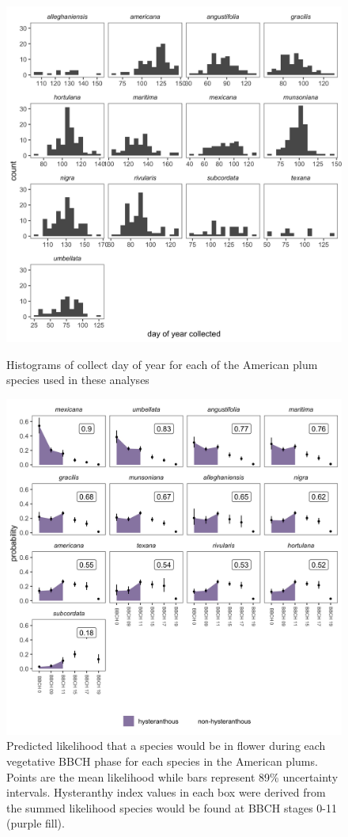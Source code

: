 \documentclass{article}[11pt]
\begin{document}
\begin{figure}[h!]
    \centering
 \includegraphics[width=.5\textwidth]{..//..//Plots/whatReviwerswant/seasonal_distrbn.jpeg}
    \label{fig:bias}
     \caption{Histograms of collect day of year for each of the American plum species used in these analyses}
\end{figure}


\begin{figure}[h!]
    \centering
 \includegraphics[width=.7\textwidth]{..//..//Plots/whatReviwerswant/sps_preds_nodoy4supp.jpeg}
    \caption{Predicted likelihood that a species would be in flower during each vegetative BBCH phase for each species in the American plums. Points are the mean likelihood while bars represent 89\% uncertainty intervals. Hysteranthy index values in each box were derived from the summed likelihood  species would be found at BBCH stages 0-11 (purple fill).}
    \label{fig:nodoy}
\end{figure}
\end{document}
